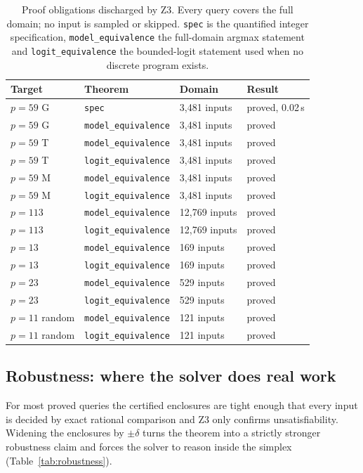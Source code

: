 \documentclass[11pt]{article}
\newcommand{\code}[1]{\texttt{#1}}
\begin{document}
\begin{table}[t]
\centering
\small
\begin{tabular}{@{}llll@{}}
\toprule
Target & Theorem & Domain & Result \\
\midrule
$p=59$ G & \code{spec} & 3{,}481 inputs & proved, 0.02\,s \\
$p=59$ G & \code{model\_equivalence} & 3{,}481 inputs & proved \\
$p=59$ T & \code{model\_equivalence} & 3{,}481 inputs & proved \\
$p=59$ T & \code{logit\_equivalence} & 3{,}481 inputs & proved \\
$p=59$ M & \code{model\_equivalence} & 3{,}481 inputs & proved \\
$p=59$ M & \code{logit\_equivalence} & 3{,}481 inputs & proved \\
$p=113$ & \code{model\_equivalence} & 12{,}769 inputs & proved \\
$p=113$ & \code{logit\_equivalence} & 12{,}769 inputs & proved \\
$p=13$ & \code{model\_equivalence} & 169 inputs & proved \\
$p=13$ & \code{logit\_equivalence} & 169 inputs & proved \\
$p=23$ & \code{model\_equivalence} & 529 inputs & proved \\
$p=23$ & \code{logit\_equivalence} & 529 inputs & proved \\
$p=11$ random & \code{model\_equivalence} & 121 inputs & proved \\
$p=11$ random & \code{logit\_equivalence} & 121 inputs & proved \\
\bottomrule
\end{tabular}
\caption{Proof obligations discharged by Z3. Every query covers the full domain; no input is sampled or skipped. \code{spec} is the quantified integer specification, \code{model\_equivalence} the full-domain argmax statement and \code{logit\_equivalence} the bounded-logit statement used when no discrete program exists.}\label{tab:verification}
\end{table}

\subsection{Robustness: where the solver does real work}

For most proved queries the certified enclosures are tight enough that every input is decided by exact rational comparison and Z3 only confirms unsatisfiability. Widening the enclosures by $\pm\delta$ turns the theorem into a strictly stronger robustness claim and forces the solver to reason inside the simplex (Table~\ref{tab:robustness}).
\end{document}

